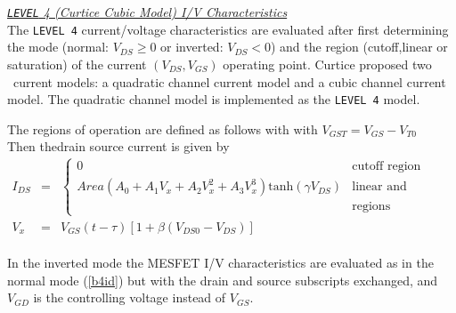 \myline
\noindent\underline{\sl {\tt LEVEL} 4 (Curtice Cubic Model)
I/V Characteristics}\\[0.1in]
      The
{\tt LEVEL 4} current/voltage characteristics are evaluated after
first determining the mode (normal: $V_{DS} \ge 0$ or inverted:
$V_{DS} < 0$) and the region (cutoff,linear or saturation) of the
current $(V_{DS}, V_{GS})$ operating point. Curtice
\cite{curtice:80} proposed two \dc\ current models: a quadratic
channel current model and a cubic channel current model.  The
quadratic channel model is implemented as the {\tt LEVEL 4} model.

\medskip


\medskip

\noindent
The regions of operation are defined as follows with
with \hfill $V_{GST} = V_{GS}-V_{T0}$ \inlineeq
\hspace*{\fill}\\[0.1in]
Then thedrain source current is given by
\begin{eqnarray}
I_{DS} &=& \left\{ \begin{array}{ll}
      0  & \mbox{cutoff region} \\
      Area \left( A_0 + A_1 V_x + A_2 V_x^2 + A_3 V_x^3 \right)
      \mbox{tanh}\left(\gamma V_{DS}\right)
         &\mbox{linear and saturation}\\
         &\mbox{regions} \end{array} \right. %
      \label{b4id} \\
      V_x &=& V_{GS}(t-\tau)\left[ 1 + \beta (V_{DS0} - V_{DS}) \right]
\end{eqnarray}
\\[0.2in]
In the inverted mode the MESFET I/V characteristics are evaluated as in the
normal mode (\ref{b4id}) but with the drain and source subscripts
exchanged, and $V_{GD}$ is the controlling voltage instead of $V_{GS}$.

